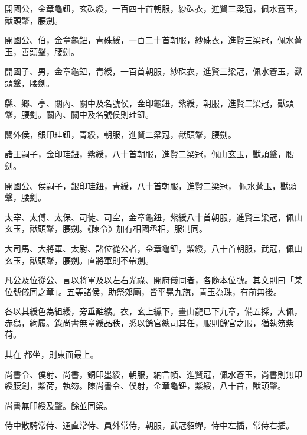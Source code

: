 \begin{pinyinscope}
 開國公，金章龜鈕，玄硃綬，一百四十首朝服，紗硃衣，進賢三梁冠，佩水蒼玉，獸頭鞶，腰劍。



 開國公、伯，金章龜鈕，青硃綬，一百二十首朝服，紗硃衣，進賢三梁冠，佩水蒼玉，善頭鞶，腰劍。



 開國子、男，金章龜鈕，青綬，一百首朝服，紗硃衣，進賢三梁冠，佩水蒼玉，獸頭鞶，腰劍。



 縣、鄉、亭、關內、關中及名號侯，金印龜鈕，紫綬，朝服，進賢二梁冠，獸頭鞶，腰劍。關內、關中及名號侯則珪鈕。



 關外侯，銀印珪鈕，青綬，朝服，進賢二梁冠，獸頭鞶，腰劍。



 諸王嗣子，金印珪鈕，紫綬，八十首朝服，進賢二梁冠，佩山玄玉，獸頭鞶，腰劍。



 開國公、侯嗣子，銀印珪鈕，青綬，八十首朝服，進賢二梁冠，
 佩水蒼玉，獸頭鞶，腰劍。



 太宰、太傅、太保、司徒、司空，金章龜鈕，紫綬八十首朝服，進賢三梁冠，佩山玄玉，獸頭鞶，腰劍。《陳令》加有相國丞相，服制同。



 大司馬、大將軍、太尉、諸位從公者，金章龜鈕，紫綬，八十首朝服，武冠，佩山玄玉，獸頭鞶，腰劍。直將軍則不帶劍。



 凡公及位從公、言以將軍及以左右光祿、開府儀同者，各隨本位號。其文則曰「某位號儀同之章」。五等諸侯，助祭郊廟，皆平冕九旒，青玉為珠，有前無後。



 各以其綬色為組纓，旁垂黈纊。衣，玄上纁下，畫山龍已下九章，備五採，大佩，赤舄，絇履。錄尚書無章綬品秩，悉以餘官總司其任，服則餘官之服，猶執笏紫荷。



 其在
 都坐，則東面最上。



 尚書令、僕射、尚書，銅印墨綬，朝服，納言幘、進賢冠，佩水蒼玉，尚書則無印綬腰劍，紫荷，執笏。陳尚書令、僕射，金章龜鈕，紫綬，八十首，獸頭鞶。



 尚書無印綬及鞶。餘並同梁。



 侍中散騎常侍、通直常侍、員外常侍，朝服，武冠貂蟬，侍中左插，常侍右插。




\end{pinyinscope}

